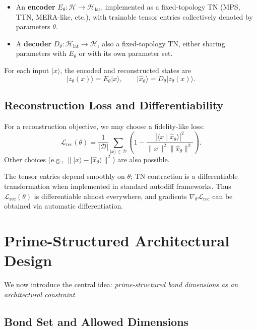 \documentclass[11pt]{article}
\begin{document}
\begin{itemize}[leftmargin=1.5em]
    \item An \textbf{encoder} $E_\theta : \mathcal{H} \to \mathcal{H}_{\mathrm{lat}}$, implemented as a fixed-topology TN (MPS, TTN, MERA-like, etc.), with trainable tensor entries collectively denoted by parameters $\theta$.

    \item A \textbf{decoder} $D_\theta : \mathcal{H}_{\mathrm{lat}} \to \mathcal{H}$, also a fixed-topology TN, either sharing parameters with $E_\theta$ or with its own parameter set.
\end{itemize}

For each input $\lvert x \rangle$, the encoded and reconstructed states are
\[
\lvert z_\theta(x) \rangle = E_\theta \lvert x \rangle, 
\qquad
\lvert \hat{x}_\theta \rangle = D_\theta \lvert z_\theta(x) \rangle.
\]

\subsection{Reconstruction Loss and Differentiability}

For a reconstruction objective, we may choose a fidelity-like loss:
\[
\mathcal{L}_{\mathrm{rec}}(\theta)
= \frac{1}{|\mathcal{D}|} \sum_{\lvert x \rangle\in \mathcal{D}}
\left(
1 - \frac{|\langle x \mid \hat{x}_\theta \rangle|^2}{\|x\|^2 \|\hat{x}_\theta\|^2}
\right).
\]
Other choices (e.g., $\|\lvert x \rangle - \lvert \hat{x}_\theta \rangle\|^2$) are also possible.

The tensor entries depend smoothly on $\theta$; TN contraction is a differentiable transformation when implemented in standard autodiff frameworks. Thus $\mathcal{L}_{\mathrm{rec}}(\theta)$ is differentiable almost everywhere, and gradients $\nabla_\theta \mathcal{L}_{\mathrm{rec}}$ can be obtained via automatic differentiation.

\section{Prime-Structured Architectural Design}

We now introduce the central idea: \emph{prime-structured bond dimensions as an architectural constraint}.

\subsection{Bond Set and Allowed Dimensions}
\end{document}
